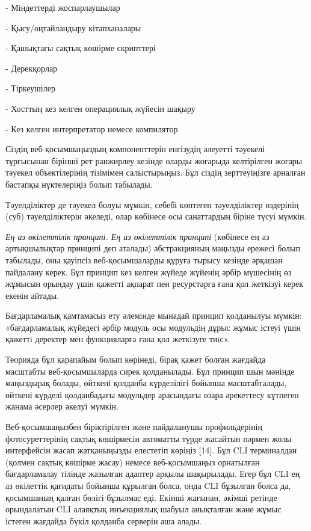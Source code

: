 - Міндеттерді жоспарлаушылар

- Қысу/оңтайландыру кітапханалары

- Қашықтағы сақтық көшірме скрипттері

- Дерекқорлар

- Тіркеушілер

- Хосттың кез келген операциялық жүйесін шақыру

- Кез келген интерпретатор немесе компилятор

Сіздің веб-қосымшаңыздың компоненттерін енгізудің әлеуетті тәуекелі
тұрғысынан бірінші рет ранжирлеу кезінде оларды жоғарыда келтірілген
жоғары тәуекел объектілерінің тізімімен салыстырыңыз. Бұл сіздің
зерттеуіңізге арналған бастапқы нүктелеріңіз болып табылады.

Тәуелділіктер де тәуекел болуы мүмкін, себебі көптеген тәуелділіктер
өздерінің (суб) тәуелділіктерін әкеледі, олар көбінесе осы санаттардың
біріне түсуі мүмкін.

\emph{Ең аз өкілеттілік принципі. Ең аз өкілеттілік принципі} (көбінесе
ең аз артықшылықтар принципі деп аталады) абстракцияның маңызды ережесі
болып табылады, оны қауіпсіз веб-қосымшаларды құруға тырысу кезінде
әрқашан пайдалану керек. Бұл принцип кез келген жүйеде жүйенің әрбір
мүшесінің өз жұмысын орындау үшін қажетті ақпарат пен ресурстарға ғана
қол жеткізуі керек екенін айтады.

Бағдарламалық қамтамасыз ету әлемiнде мынадай принцип қолданылуы мүмкiн:
«бағдарламалық жүйедегi әрбiр модуль осы модульдiң дұрыс жұмыс iстеуi
үшiн қажеттi деректер мен функцияларға ғана қол жеткiзуге тиiс».

Теорияда бұл қарапайым болып көрінеді, бірақ қажет болған жағдайда
масштабты веб-қосымшаларда сирек қолданылады. Бұл принцип шын мәнінде
маңыздырақ болады, өйткені қолданба күрделілігі бойынша масштабталады,
өйткені күрделі қолданбадағы модульдер арасындағы өзара әрекеттесу
күтпеген жанама әсерлер әкелуі мүмкін.

Веб-қосымшаңызбен біріктірілген және пайдаланушы профильдерінің
фотосуреттерінің сақтық көшірмесін автоматты түрде жасайтын пәрмен жолы
интерфейсін жасап жатқаныңызды елестетіп көріңіз {[}14{]}. Бұл CLI
терминалдан (қолмен сақтық көшірме жасау) немесе веб-қосымшаңыз
орнатылған бағдарламалау тілінде жазылған адаптер арқылы шақырылады.
Егер бұл CLI ең аз өкілеттік қағидаты бойынша құрылған болса, онда CLI
бұзылған болса да, қосымшаның қалған бөлігі бұзылмас еді. Екінші
жағынан, әкімші ретінде орындалатын CLI алаяқтық инъекциялық шабуыл
анықталған және жұмыс істеген жағдайда бүкіл қолданба серверін аша
алады.

